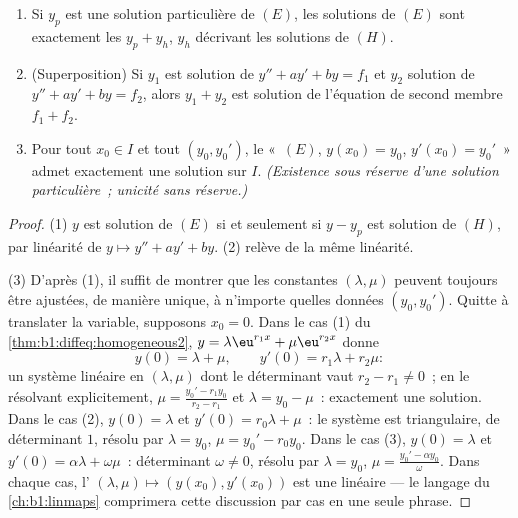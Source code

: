 \begin{theorem}\label{thm:b1:diffeq:structure2}
\begin{enumerate}
  \item Si $y_p$ est une solution particulière de $(E)$, les solutions
        de $(E)$ sont exactement les $y_p + y_h$, $y_h$ décrivant les
        solutions de $(H)$.
  \item (Superposition) Si $y_1$ est solution de $y'' + ay' + by = f_1$
        et $y_2$ solution de $y'' + ay' + by = f_2$, alors $y_1 + y_2$
        est solution de l'équation de second membre $f_1 + f_2$.
  \item Pour tout $x_0 \in I$ et tout $(y_0, y_0')$, le  «~$(E)$, $y(x_0) = y_0$, $y'(x_0) = y_0'$~» admet
        exactement une solution sur $I$. \emph{(Existence sous réserve
        d'une solution particulière~; unicité sans réserve.)}
\end{enumerate}
\end{theorem}

\begin{proof}
(1) $y$ est solution de $(E)$ si et seulement si $y - y_p$ est
solution de $(H)$, par linéarité de $y \mapsto y'' + ay' + by$. (2)
relève de la même linéarité.

(3) D'après (1), il suffit de montrer que les constantes $(\lambda,
\mu)$ peuvent toujours être ajustées, de manière unique, à n'importe
quelles données $(y_0, y_0')$. Quitte à translater la variable,
supposons $x_0 = 0$. Dans le cas (1) du
\cref{thm:b1:diffeq:homogeneous2}, $y = \lambda\eu^{r_1x} +
\mu\eu^{r_2x}$ donne
\[
y(0) = \lambda + \mu, \qquad y'(0) = r_1\lambda + r_2\mu :
\]
un système linéaire en $(\lambda, \mu)$ dont le déterminant vaut $r_2
- r_1 \neq 0$~; en le résolvant explicitement, $\mu = \frac{y_0' -
r_1y_0}{r_2 - r_1}$ et $\lambda = y_0 - \mu$~: exactement une
solution. Dans le cas (2), $y(0) = \lambda$ et $y'(0) = r_0\lambda +
\mu$~: le système est triangulaire, de déterminant $1$, résolu par
$\lambda = y_0$, $\mu = y_0' - r_0y_0$. Dans le cas (3), $y(0) =
\lambda$ et $y'(0) = \alpha\lambda + \omega\mu$~: déterminant $\omega
\neq 0$, résolu par $\lambda = y_0$, $\mu = \frac{y_0' - \alpha
y_0}\omega$. Dans chaque cas, l' $(\lambda, \mu) \mapsto
(y(x_0), y'(x_0))$ est une  linéaire --- le langage du
\cref{ch:b1:linmaps} comprimera cette discussion par cas en une seule
phrase.
\end{proof}


